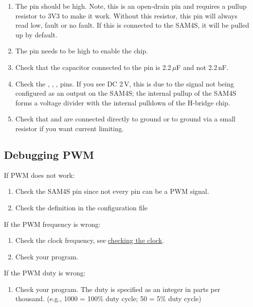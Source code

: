 \begin{enumerate}
\item The  pin should be high.  Note, this is an
  open-drain pin and requires a pullup resistor to 3V3 to make it
  work.  Without this resistor, this pin will always read low, fault
  or no fault.  If this is connected to the SAM4S, it will be pulled
  up by default.

\item The  pin needs to be high to enable the chip.

\item Check that the capacitor connected to the  pin is
  2.2\,$\mu$F and not 2.2\,nF.

\item Check the , , ,  pins.
  If you see DC 2\,V, this is due to the signal not being configured
  as an output on the SAM4S; the internal pullup of the SAM4S forms a
  voltage divider with the internal pulldown of the H-bridge chip.

\item Check that  and  are connected
  directly to ground or to ground via a small resistor if you want
  current limiting.
\end{enumerate}


\subsection{Debugging PWM}
\label{debugging-pwm}

If PWM does not work:

\begin{enumerate}
\item
  Check the SAM4S pin since not every pin can be a PWM signal.
\item
  Check the definition in the configuration file 
\end{enumerate}

If the PWM frequency is wrong:

\begin{enumerate}
\item
  Check the clock frequency, see
  \hyperref[checking-the-clock]{checking the clock}.
\item
  Check your program.
\end{enumerate}

If the PWM duty is wrong:

\begin{enumerate}
\item
  Check your program. The duty is specified as an integer in parts per
  thousand. (e.g., 1000 = 100\% duty cycle; 50 = 5\% duty cycle)
\end{enumerate}

